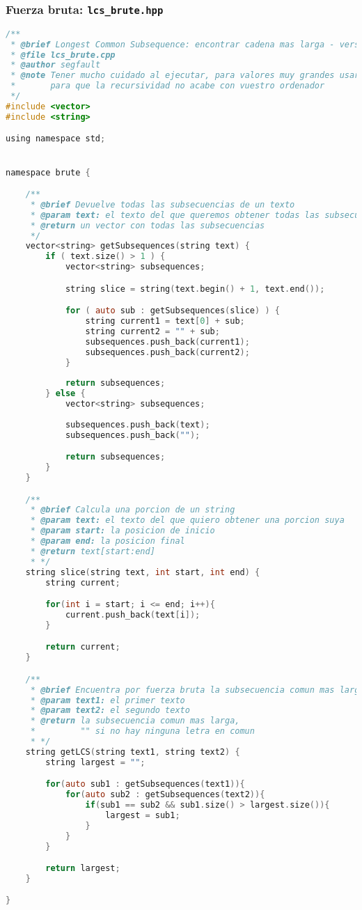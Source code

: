 \documentclass[10pt, a4paper]{article}
\theoremstyle{theorem-style}
\theoremstyle{theorem-style}
\theoremstyle{definition-style}
\theoremstyle{remark-style}
\theoremstyle{example-style}
\theoremstyle{definition-style}
\theoremstyle{remark-style}
\begin{document}
\subsubsection*{Fuerza bruta: \texttt{lcs\_brute.hpp}}
\begin{lstlisting}[language=C]
/**
 * @brief Longest Common Subsequence: encontrar cadena mas larga - version Fuerza Bruta
 * @file lcs_brute.cpp
 * @author segfault
 * @note Tener mucho cuidado al ejecutar, para valores muy grandes usar valgrind
 *       para que la recursividad no acabe con vuestro ordenador
 */
#include <vector>
#include <string>

using namespace std;


namespace brute {

    /**
     * @brief Devuelve todas las subsecuencias de un texto
     * @param text: el texto del que queremos obtener todas las subsecuencias
     * @return un vector con todas las subsecuencias
     */
    vector<string> getSubsequences(string text) {
        if ( text.size() > 1 ) {
            vector<string> subsequences;

            string slice = string(text.begin() + 1, text.end());

            for ( auto sub : getSubsequences(slice) ) {
                string current1 = text[0] + sub;
                string current2 = "" + sub;
                subsequences.push_back(current1);
                subsequences.push_back(current2);
            }
            
            return subsequences;
        } else {
            vector<string> subsequences;
        
            subsequences.push_back(text);
            subsequences.push_back("");

            return subsequences;
        }
    }

    /**
     * @brief Calcula una porcion de un string
     * @param text: el texto del que quiero obtener una porcion suya
     * @param start: la posicion de inicio
     * @param end: la posicion final
     * @return text[start:end]
     * */
    string slice(string text, int start, int end) {
        string current;

        for(int i = start; i <= end; i++){
            current.push_back(text[i]);
        }

        return current;
    }

    /**
     * @brief Encuentra por fuerza bruta la subsecuencia comun mas larga 
     * @param text1: el primer texto
     * @param text2: el segundo texto
     * @return la subsecuencia comun mas larga,
     *         "" si no hay ninguna letra en comun
     * */
    string getLCS(string text1, string text2) {
        string largest = "";

        for(auto sub1 : getSubsequences(text1)){
            for(auto sub2 : getSubsequences(text2)){
                if(sub1 == sub2 && sub1.size() > largest.size()){
                    largest = sub1;
                }
            }
        }

        return largest;
    }

}
\end{lstlisting}
\end{document}
